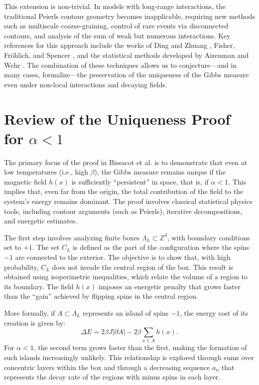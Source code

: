 \documentclass{article}
\begin{document}
This extension is non-trivial. In models with long-range interactions, the traditional Peierls contour geometry becomes inapplicable, requiring new methods such as multiscale coarse-graining, control of rare events via disconnected contours, and analysis of the sum of weak but numerous interactions. Key references for this approach include the works of Ding and Zhuang \cite{ding2024}, Fisher, Fröhlich, and Spencer \cite{fisher1984}, and the statistical methods developed by Aizenman and Wehr \cite{aizenman1990}. The combination of these techniques allows us to conjecture—and in many cases, formalize—the preservation of the uniqueness of the Gibbs measure even under non-local interactions and decaying fields.

\section{Review of the Uniqueness Proof for $\alpha<1$}
\hypertarget{pag3}{}
The primary focus of the proof in Bissacot et al. \cite{bissacot2015} is to demonstrate that even at low temperatures (i.e., high $\beta$), the Gibbs measure remains unique if the magnetic field $h(x)$ is sufficiently ``persistent'' in space, that is, if $\alpha<1$. This implies that, even far from the origin, the total contribution of the field to the system's energy remains dominant. The proof involves classical statistical physics tools, including contour arguments (such as Peierls), iterative decompositions, and energetic estimates.

The first step involves analyzing finite boxes $\Lambda_L \subset \mathbb{Z}^d$, with boundary conditions set to $+1$. The set $C_L$ is defined as the part of the configuration where the spins $-1$ are connected to the exterior. The objective is to show that, with high probability, $C_L$ does not invade the central region of the box. This result is obtained using isoperimetric inequalities, which relate the volume of a region to its boundary. The field $h(x)$ imposes an energetic penalty that grows faster than the ``gain'' achieved by flipping spins in the central region.

More formally, if $A \subset \Lambda_L$ represents an island of spins $-1$, the energy cost of its creation is given by:
\[
\Delta E = 2\beta J|\partial A| - 2\beta\sum_{x \in A} h(x).
\]
For $\alpha<1$, the second term grows faster than the first, making the formation of such islands increasingly unlikely. This relationship is explored through sums over concentric layers within the box and through a decreasing sequence $a_n$ that represents the decay rate of the regions with minus spins in each layer.
\end{document}
